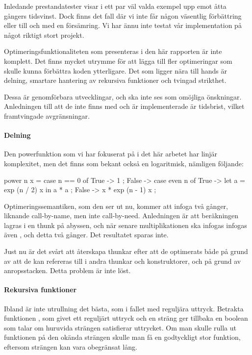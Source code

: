 \documentclass[Rapport]{subfiles}
\begin{document}
Inledande prestandatester visar i ett par väl valda exempel upp emot åtta gångers
tidsvinst. Dock finns det fall där vi inte får någon väsentlig förbättring eller
till och med en försämring. Vi har ännu inte testat vår implementation på något riktigt stort
projekt. 

Optimeringsfunktionaliteten som presenteras i den här rapporten är inte
komplett. Det finns mycket utrymme för att lägga till fler optimeringar
som skulle kunna förbättra koden ytterligare. Det som ligger nära till hands är
delning, smartare hantering av rekursiva funktioner och tvingad strikthet.

Dessa är genomförbara utvecklingar, och ska inte ses som omöjliga önskningar.
Anledningen till att de inte finns med och är implementerade är tidsbrist, vilket
framtvingade avgränsningar.

\paragraph{Delning}
Den powerfunktion som vi har fokuserat på i det här arbetet har linjär
komplexitet, men det finns som bekant också en logaritmisk, nämligen följande:

\begin{codeEx}
power n x = case n == 0 of
    { True  -> 1
    ; False -> case even n of
        { True  -> let a = exp (n / 2) x 
                   in  a * a
        ; False -> x * exp (n - 1) x
        }
    };
\end{codeEx}

Optimeringssemantiken, som den ser ut nu, kommer att infoga  två gånger,
liknande call-by-name, men inte call-by-need. Anledningen är att beräkningen
 lagras i en thunk på abyssen, och när senare multiplikationen ska
infogas infogas även , och detta två gånger. Det resultatet sparas
inte.

    Just nu är det svårt att återskapa thunkar efter att de optimerats både på grund
av att de kan refereras till i andra thunkar och konstruktorer, och på grund
av anropsstacken. Detta problem är inte löst.

\paragraph{Rekursiva funktioner}
\label{sec:future-regexp}
Ibland är inte utrullning det bästa, som i fallet med reguljära uttryck.
Betrakta funktionen , som givet
ett reguljärt uttryck och en sträng ger tillbaka en boolean som talar om huruvida strängen
satisfierar uttrycket. Om man skulle rulla ut funktionen på den okända strängen
skulle man få en godtyckligt stor funktion, eftersom strängen kan vara 
obegränsat lång.
\end{document}
